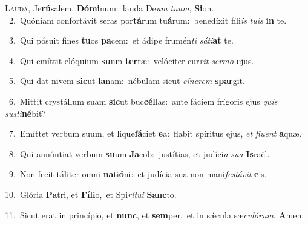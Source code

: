 \lettrine{\initial\textcolor{\initialcolor}{L}}{auda,} Je\-\textbf{rú}\-salem, \textbf{Dó}\-\textbf{mi}num:~\star lauda De\textit{um} \textit{tu}\-\textit{um}, \textbf{Si}\-on.\\
{\numbfont\textcolor{\numbcolor}{~2.}}~Quóniam confortávit seras por\-\textbf{tá}\-rum tu\-\textbf{á}\-rum:~\star benedíxit fíli\textit{is} \textit{tu}\-\textit{is} \textbf{in} te.\par
{\numbfont\textcolor{\numbcolor}{~3.}}~Qui pósuit fines \textbf{tu}\-os \textbf{pa}\-cem:~\star et ádipe frumén\textit{ti} \textit{sá}\-\textit{ti}\textbf{at} te.\par
{\numbfont\textcolor{\numbcolor}{~4.}}~Qui emíttit elóquium \textbf{su}\-um \textbf{ter}\-ræ:~\star velóciter cur\textit{rit} \textit{ser}\-\textit{mo} \textbf{e}\-jus.\par
{\numbfont\textcolor{\numbcolor}{~5.}}~Qui dat nivem \textbf{sic}\-ut \textbf{la}\-nam:~\star nébulam sicut \textit{cí}\-\textit{ne}\textit{rem} \textbf{spar}\-git.\par
{\numbfont\textcolor{\numbcolor}{~6.}}~Mittit crystállum suam \textbf{sic}\-ut buc\-\textbf{cél}\-las:~\star ante fáciem frígoris ejus \textit{quis} \textit{sus}\-\textit{ti}\textbf{né}bit?\par
{\numbfont\textcolor{\numbcolor}{~7.}}~Emíttet verbum suum, et lique\-\textbf{fá}\-ciet \textbf{e}\-a:~\star flabit spíritus ejus, \textit{et} \textit{flu}\-\textit{ent} \textbf{a}\-quæ.\par
{\numbfont\textcolor{\numbcolor}{~8.}}~Qui annúntiat verbum \textbf{su}\-um \textbf{Ja}\-cob:~\star justítias, et judíci\textit{a} \textit{su}\-\textit{a} \textbf{Is}\-raël.\par
{\numbfont\textcolor{\numbcolor}{~9.}}~Non fecit táliter omni \textbf{na}\-ti\-\textbf{ó}\-ni:~\star et judícia sua non mani\-\textit{fes}\-\textit{tá}\textit{vit} \textbf{e}\-is.\par
{\numbfont\textcolor{\numbcolor}{10.}}~Glória \textbf{Pa}\-tri, et \textbf{Fí}\-\textbf{li}o,~\star et Spi\-\textit{rí}\-\textit{tu}\textit{i} \textbf{Sanc}\-to.\par
{\numbfont\textcolor{\numbcolor}{11.}}~Sicut erat in princípio, et \textbf{nunc}\-, et \textbf{sem}\-per,~\star et in sǽcula sæ\-\textit{cu}\-\textit{ló}\textit{rum}. \textbf{A}\-men.\par
